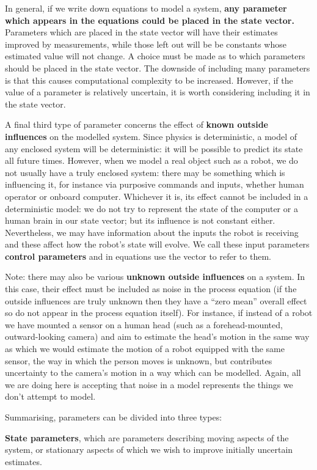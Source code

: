 \documentclass{article}
\begin{document}
In general, if we write down equations to model a system, {\bf any
parameter which appears in the equations could be placed in the state vector.}
Parameters which are placed in the state vector will have their
estimates improved by measurements, while those left out will be be
constants whose estimated value will not change. A choice must be made
as to which parameters should be placed in the state vector. The
downside of including many parameters is that this causes
computational complexity to be increased. However, if the value of a
parameter is relatively uncertain, it is worth considering including it
in the state vector.

A final third type of parameter concerns the effect of {\bf known
outside influences} on the modelled system. Since physics is
deterministic, a model of any enclosed system will be deterministic:
it will be possible to predict its state all future times. However,
when we model a real object such as a robot, we do not usually have a
truly enclosed system: there may be something which is
influencing it, for instance via purposive commands and inputs, whether human operator or
onboard computer. Whichever it is, its effect cannot be included in a
deterministic model: we do not try to represent the state of the
computer or a human brain in our state vector; but its influence is
not constant either. Nevertheless, we may have information about the
inputs the robot is receiving and these affect how the robot's state
will evolve. We call these input parameters {\bf control parameters}
and in equations use the vector {\vecu} to refer to them.

Note: there may also be various {\bf unknown outside influences} on a
system. In this case, their effect must be included as noise in the
process equation (if the outside influences are truly unknown then
they have a ``zero mean'' overall effect so do not appear in the
process equation itself). For instance, if instead of a robot we have
mounted a sensor on a human head (such as a forehead-mounted,
outward-looking camera) and aim to estimate the head's motion in the
same way as which we would estimate the motion of a robot equipped
with the same sensor, the way in which the
person moves is unknown, but contributes uncertainty to the camera's
motion in a way which can be modelled. Again, all we are doing here is
accepting that noise in a model represents the things we don't attempt
to model.

Summarising, parameters can be divided into three types:
\be
\item {\bf State parameters}, which are parameters describing moving
aspects of the system, or stationary aspects of which we wish to
improve initially uncertain estimates.
\end{document}
